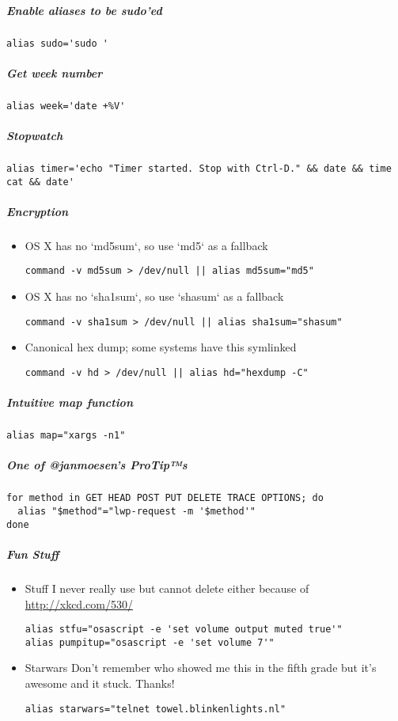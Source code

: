 \documentclass[11pt]{article}
\begin{document}
\subparagraph{Enable aliases to be sudo’ed}
\label{sec:orgc71c5dc}
\begin{verbatim}
alias sudo='sudo '
\end{verbatim}

\subparagraph{Get week number}
\label{sec:orgd12ecc2}
\begin{verbatim}
alias week='date +%V'
\end{verbatim}

\subparagraph{Stopwatch}
\label{sec:orgd1ab774}
\begin{verbatim}
alias timer='echo "Timer started. Stop with Ctrl-D." && date && time cat && date'
\end{verbatim}
\subparagraph{Encryption}
\label{sec:orge1fa5b9}
\begin{itemize}
\item OS X has no `md5sum`, so use `md5` as a fallback
\label{sec:org109901f}
\begin{verbatim}
command -v md5sum > /dev/null || alias md5sum="md5"
\end{verbatim}
\item OS X has no `sha1sum`, so use `shasum` as a fallback
\label{sec:org52b5686}
\begin{verbatim}
command -v sha1sum > /dev/null || alias sha1sum="shasum"
\end{verbatim}
\item Canonical hex dump; some systems have this symlinked
\label{sec:org19be368}
\begin{verbatim}
command -v hd > /dev/null || alias hd="hexdump -C"
\end{verbatim}
\end{itemize}

\subparagraph{Intuitive map function}
\label{sec:orgde47aa2}
\begin{verbatim}
alias map="xargs -n1"
\end{verbatim}

\subparagraph{One of @janmoesen’s ProTip™s}
\label{sec:org820c261}
\begin{verbatim}
for method in GET HEAD POST PUT DELETE TRACE OPTIONS; do
  alias "$method"="lwp-request -m '$method'"
done
\end{verbatim}

\subparagraph{Fun Stuff}
\label{sec:org206ffce}
\begin{itemize}
\item Stuff I never really use but cannot delete either because of \url{http://xkcd.com/530/}
\label{sec:org170e730}
\begin{verbatim}
alias stfu="osascript -e 'set volume output muted true'"
alias pumpitup="osascript -e 'set volume 7'"
\end{verbatim}

\item Starwars
\label{sec:org6ca0181}
Don't remember who showed me this in the fifth grade but it's awesome and it stuck. Thanks!

\begin{verbatim}
alias starwars="telnet towel.blinkenlights.nl"
\end{verbatim}
\end{itemize}
\end{document}
